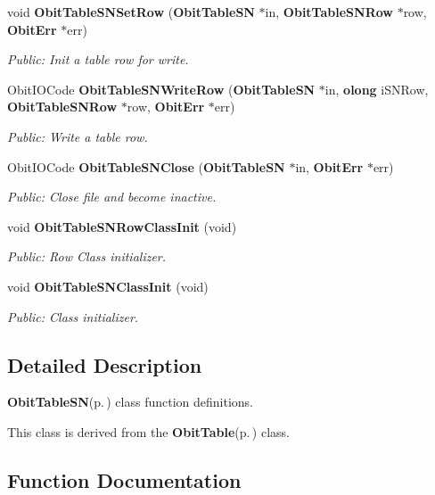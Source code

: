 \begin{CompactItemize}
void {\bf Obit\-Table\-SNSet\-Row} ({\bf Obit\-Table\-SN} $\ast$in, {\bf Obit\-Table\-SNRow} $\ast$row, {\bf Obit\-Err} $\ast$err)
\begin{CompactList}\small\item\em Public: Init a table row for write. \item\end{CompactList}\item 
Obit\-IOCode {\bf Obit\-Table\-SNWrite\-Row} ({\bf Obit\-Table\-SN} $\ast$in, {\bf olong} i\-SNRow, {\bf Obit\-Table\-SNRow} $\ast$row, {\bf Obit\-Err} $\ast$err)
\begin{CompactList}\small\item\em Public: Write a table row. \item\end{CompactList}\item 
Obit\-IOCode {\bf Obit\-Table\-SNClose} ({\bf Obit\-Table\-SN} $\ast$in, {\bf Obit\-Err} $\ast$err)
\begin{CompactList}\small\item\em Public: Close file and become inactive. \item\end{CompactList}\item 
void {\bf Obit\-Table\-SNRow\-Class\-Init} (void)
\begin{CompactList}\small\item\em Public: Row Class initializer. \item\end{CompactList}\item 
void {\bf Obit\-Table\-SNClass\-Init} (void)
\begin{CompactList}\small\item\em Public: Class initializer. \item\end{CompactList}\end{CompactItemize}


\subsection{Detailed Description}
{\bf Obit\-Table\-SN}{\rm (p.\,\pageref{structObitTableSN})} class function definitions. 

This class is derived from the {\bf Obit\-Table}{\rm (p.\,\pageref{structObitTable})} class.

\subsection{Function Documentation}
